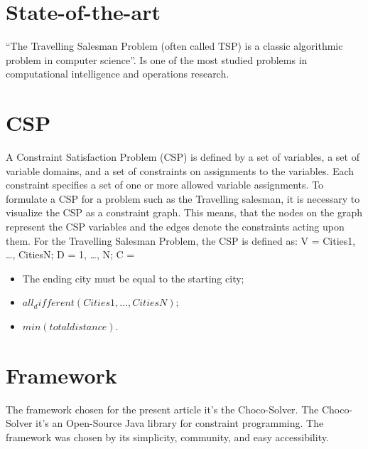 \documentclass[runningheads,a4paper,english]{llncs}[2022/01/12]
\begin{document}
\section{State-of-the-art}
\label{sec:StateArt}
``The Travelling Salesman Problem (often called TSP) is a classic algorithmic problem in computer science''. \cite{imageTSP}
Is one of the most studied problems in computational intelligence and operations research. \cite{naturedInspiredTSP}

\section{CSP}
\label{sec:CSP}
A Constraint Satisfaction Problem (CSP) is defined by a set of variables, a set of variable domains, and a set of constraints on assignments to the variables. 
Each constraint specifies a set of one or more allowed variable assignments. \cite{CSPFormulation}\newline\newline
To formulate a CSP for a problem such as the Travelling salesman, 
it is necessary to visualize the CSP as a constraint graph. 
This means, that the nodes on the graph represent the CSP variables 
and the edges denote the constraints acting upon them. \cite{MSCSP}\newline\newline
For the Travelling Salesman Problem, the CSP is defined as:\newline
V = {Cities1, …, CitiesN};\newline
D = {1, …, N};\newline
C = \begin{itemize}
  \item The ending city must be equal to the starting city;
  \item $all_different(Cities1, …, CitiesN)$;
  \item $min (total distance)$.
\end{itemize}


\section{Framework}
\label{sec:Framework}
The framework chosen for the present article it’s the Choco-Solver. 
The Choco-Solver it’s an Open-Source Java library for constraint programming. \cite{chocoSolver}\newline
The framework was chosen by its simplicity, community, and easy accessibility.
\end{document}
